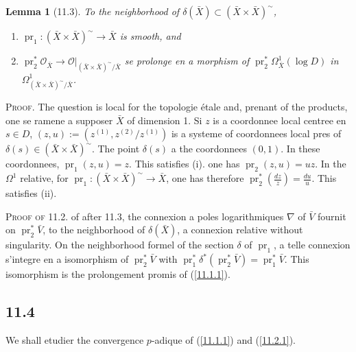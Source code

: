 \documentclass[12pt,a4paper]{article}
\theoremstyle{plain}
\newtheorem{lemma}[theorem]{Lemma}
\theoremstyle{definition}
\theoremstyle{remark}
\DeclareMathOperator{\pr}{pr}
\begin{document}
\begin{lemma}[11.3]
To the neighborhood of $\delta(\bar{X}) \subset (\bar{X} \times \bar{X})^\sim$,
\begin{enumerate}[label=(\roman*)]
\item $\pr_1: (\bar{X} \times \bar{X})^\sim \to \bar{X}$ is smooth, and
\item $\pr_2^* \mathcal{O}_{\bar{X}} \to \mathcal{O}|_{(\bar{X} \times \bar{X})^\sim/\bar{X}}$ se prolonge en a morphism of $\pr_2^* \Omega^1_{\bar{X}}(\log D)$ in $\Omega^1_{(\bar{X} \times \bar{X})^\sim/\bar{X}}$.
\end{enumerate}
\end{lemma}

\textsc{Proof.} The question is local for the topologie étale and, prenant of the products, one se ramene a supposer $\bar{X}$ of dimension 1. Si $z$ is a coordonnee local centree en $s \in D$, $(z, u) := (z^{(1)}, z^{(2)}/z^{(1)})$ is a systeme of coordonnees local pres of $\delta(s) \in (\bar{X} \times \bar{X})^\sim$. The point $\delta(s)$ a the coordonnees $(0, 1)$. In these coordonnees, $\pr_1(z, u) = z$. This satisfies (i). one has $\pr_2(z, u) = uz$. In the $\Omega^1$ relative, for $\pr_1: (\bar{X} \times \bar{X})^\sim \to \bar{X}$, one has therefore $\pr_2^*(\frac{dz}{z}) = \frac{du}{u}$. This satisfies (ii).

\textsc{Proof of 11.2.} of after 11.3, the connexion a poles logarithmiques $\nabla$ of $\bar{V}$ fournit on $\pr_2^* \bar{V}$, to the neighborhood of $\delta(\bar{X})$, a connexion relative without singularity. On the neighborhood formel of the section $\delta$ of $\pr_1$, a telle connexion s'integre en a isomorphism of $\pr_2^* \bar{V}$ with $\pr_1^* \delta^*(\pr_2^* \bar{V}) = \pr_1^* \bar{V}$. This isomorphism is the prolongement promis of (\ref{11.1.1}).

\subsection*{11.4}

We shall etudier the convergence $p$-adique of (\ref{11.1.1}) and (\ref{11.2.1}).
\end{document}
